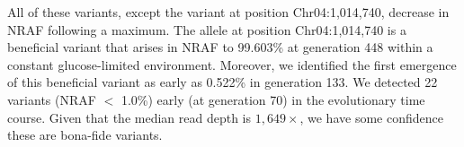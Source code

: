 \documentclass{bmcart}
\begin{document}



All of these variants, except the variant at position Chr04:1,014,740, decrease in NRAF following a maximum.
The allele at position Chr04:1,014,740 is a beneficial variant that arises in NRAF to 99.603\% at generation 448 within a constant glucose-limited environment.
Moreover, we identified the first emergence of this beneficial variant as early as 0.522\% in generation 133.
We detected 22 variants (NRAF $<$ 1.0\%) early (at generation 70) in the evolutionary time course.
Given that the median read depth is $1,649\times$, we have some confidence these are bona-fide variants.

\end{document}
